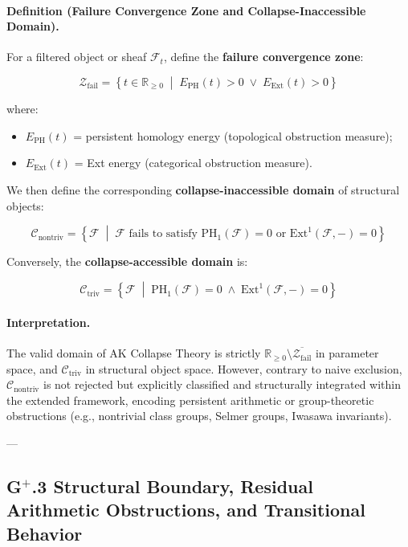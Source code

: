 \documentclass[11pt]{article}
\begin{document}
\paragraph{Definition (Failure Convergence Zone and Collapse-Inaccessible Domain).}

For a filtered object or sheaf $\mathcal{F}_t$, define the \textbf{failure convergence zone}:

\[
\mathcal{Z}_{\mathrm{fail}} = \left\{ t \in \mathbb{R}_{\geq 0} \;\middle|\; E_{\mathrm{PH}}(t) > 0 \;\lor\; E_{\mathrm{Ext}}(t) > 0 \right\}
\]

where:

\begin{itemize}
    \item $E_{\mathrm{PH}}(t)$ = persistent homology energy (topological obstruction measure);
    \item $E_{\mathrm{Ext}}(t)$ = Ext energy (categorical obstruction measure).
\end{itemize}

We then define the corresponding \textbf{collapse-inaccessible domain} of structural objects:

\[
\mathcal{C}_{\mathrm{nontriv}} = \left\{ \mathcal{F} \;\middle|\; \mathcal{F} \text{ fails to satisfy } \mathrm{PH}_1(\mathcal{F}) = 0 \text{ or } \mathrm{Ext}^1(\mathcal{F}, -) = 0 \right\}
\]

Conversely, the \textbf{collapse-accessible domain} is:

\[
\mathcal{C}_{\mathrm{triv}} = \left\{ \mathcal{F} \;\middle|\; \mathrm{PH}_1(\mathcal{F}) = 0 \;\land\; \mathrm{Ext}^1(\mathcal{F}, -) = 0 \right\}
\]

\paragraph{Interpretation.}
The valid domain of AK Collapse Theory is strictly $\mathbb{R}_{\geq 0} \setminus \overline{\mathcal{Z}_{\mathrm{fail}}}$ in parameter space, and $\mathcal{C}_{\mathrm{triv}}$ in structural object space. However, contrary to naive exclusion, $\mathcal{C}_{\mathrm{nontriv}}$ is not rejected but explicitly classified and structurally integrated within the extended framework, encoding persistent arithmetic or group-theoretic obstructions (e.g., nontrivial class groups, Selmer groups, Iwasawa invariants).

---

\subsection*{G$^{+}$.3 Structural Boundary, Residual Arithmetic Obstructions, and Transitional Behavior}
\end{document}
